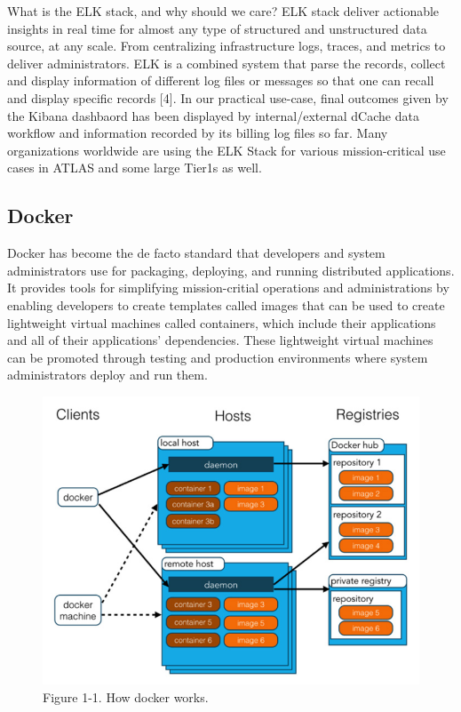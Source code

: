 \documentclass[]{article}
\begin{document}
What is the ELK stack, and why should we care? ELK stack deliver
actionable insights in real time for almost any type of structured and
unstructured data source, at any scale. From centralizing infrastructure
logs, traces, and metrics to deliver administrators. ELK is a combined
system that parse the records, collect and display information of
different log files or messages so that one can recall and display
specific records {[}4{]}. In our practical use-case, final outcomes
given by the Kibana dashbaord has been displayed by internal/external
dCache data workflow and information recorded by its billing log files
so far. Many organizations worldwide are using the ELK Stack for various
mission-critical use cases in ATLAS and some large Tier1s as well.

\subsection{Docker}\label{docker}

Docker has become the de facto standard that developers and system
administrators use for packaging, deploying, and running distributed
applications. It provides tools for simplifying mission-critial
operations and administrations by enabling developers to create
templates called images that can be used to create lightweight virtual
machines called containers, which include their applications and all of
their applications' dependencies. These lightweight virtual machines can
be promoted through testing and production environments where system
administrators deploy and run them.

\begin{figure}[htbp]
\centering
\includegraphics{images/docker.png}
\caption{Figure 1-1. How docker works.}
\end{figure}
\end{document}
